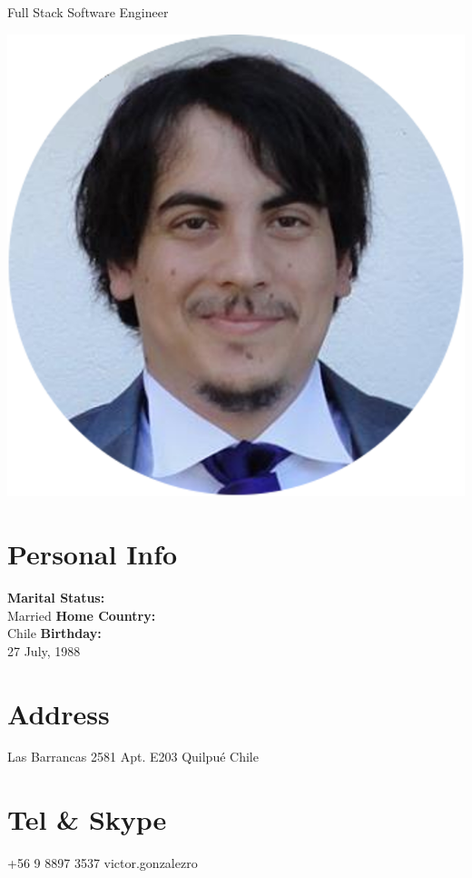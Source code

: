 \documentclass[]{friggeri-cv}
\begin{document}
      {Full Stack Software Engineer}
      

\begin{aside}
  \includegraphics[scale=0.15]{img/cv_circle.png}
  \section{\faBookmark\space Personal Info}
    \textbf{Marital Status:}\\ Married
    \textbf{Home Country:}\\ Chile
    \textbf{Birthday:}\\ 27 July, 1988
    ~
  \section{\faHome\space Address}
    Las Barrancas 2581
	Apt. E203
	Quilpué
	Chile
    ~
  \section{\faPhone\space Tel \& Skype}
    \faMobile\space +56 9 8897 3537
    \faSkype\space victor.gonzalezro
    ~

\end{aside}
\end{document}
